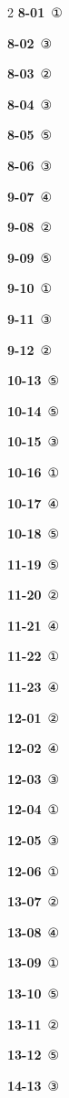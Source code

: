 \documentclass[10pt,a4paper]{article}
\begin{document}
\begin{multicols}{2}\small
\noindent\textbf{8-01}\ ①\par
\noindent\textbf{8-02}\ ③\par
\noindent\textbf{8-03}\ ②\par
\noindent\textbf{8-04}\ ③\par
\noindent\textbf{8-05}\ ⑤\par
\noindent\textbf{8-06}\ ③\par
\noindent\textbf{9-07}\ ④\par
\noindent\textbf{9-08}\ ②\par
\noindent\textbf{9-09}\ ⑤\par
\noindent\textbf{9-10}\ ①\par
\noindent\textbf{9-11}\ ③\par
\noindent\textbf{9-12}\ ②\par
\noindent\textbf{10-13}\ ⑤\par
\noindent\textbf{10-14}\ ⑤\par
\noindent\textbf{10-15}\ ③\par
\noindent\textbf{10-16}\ ①\par
\noindent\textbf{10-17}\ ④\par
\noindent\textbf{10-18}\ ⑤\par
\noindent\textbf{11-19}\ ⑤\par
\noindent\textbf{11-20}\ ②\par
\noindent\textbf{11-21}\ ④\par
\noindent\textbf{11-22}\ ①\par
\noindent\textbf{11-23}\ ④\par
\noindent\textbf{12-01}\ ②\par
\noindent\textbf{12-02}\ ④\par
\noindent\textbf{12-03}\ ③\par
\noindent\textbf{12-04}\ ①\par
\noindent\textbf{12-05}\ ③\par
\noindent\textbf{12-06}\ ①\par
\noindent\textbf{13-07}\ ②\par
\noindent\textbf{13-08}\ ④\par
\noindent\textbf{13-09}\ ①\par
\noindent\textbf{13-10}\ ⑤\par
\noindent\textbf{13-11}\ ②\par
\noindent\textbf{13-12}\ ⑤\par
\noindent\textbf{14-13}\ ③\par

\end{multicols}
\end{document}

